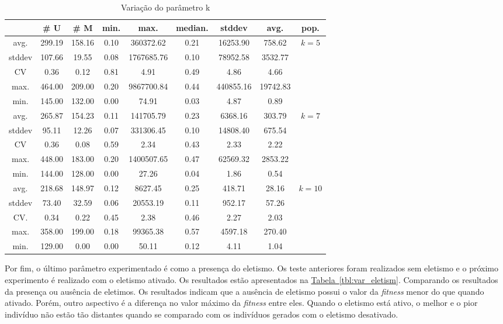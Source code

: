 \documentclass[a4paper]{paper}
\begin{document}
\begin{table}
  \center
  \caption{Variação do parâmetro k}
  \label{tbl:var_k}
  \begin{tabular}{| c | c | c | c | c | c | c | c | c |}
    \hline
    &  \# U & \# M & min. & max. & median. & stddev & avg. & pop. \\ \hline \hline
avg. & 299.19 & 158.16 & 0.10 & 360372.62 & 0.21 & 16253.90 & 758.62 & \multirow{5}{1.5cm}{$k=5$} \\ \cline{1-8}
stddev & 107.66 & 19.55 & 0.08 & 1767685.76 & 0.10 & 78952.58 & 3532.77 & \\ \cline{1-8}
CV & 0.36 & 0.12 & 0.81 & 4.91 & 0.49 & 4.86 & 4.66 & \\ \cline{1-8}
max. & 464.00 & 209.00 & 0.20 & 9867700.84 & 0.44 & 440855.16 & 19742.83 & \\ \cline{1-8}
min. & 145.00 & 132.00 & 0.00 & 74.91 & 0.03 & 4.87 & 0.89 & \\ \hline \hline
avg. & 265.87 & 154.23 & 0.11 & 141705.79 & 0.23 & 6368.16 & 303.79 & \multirow{5}{1.5cm}{$k=7$} \\ \cline{1-8}
stddev & 95.11 & 12.26 & 0.07 & 331306.45 & 0.10 & 14808.40 & 675.54 & \\ \cline{1-8}
CV & 0.36 & 0.08 & 0.59 & 2.34 & 0.43 & 2.33 & 2.22 & \\ \cline{1-8}
max. & 448.00 & 183.00 & 0.20 & 1400507.65 & 0.47 & 62569.32 & 2853.22 & \\ \cline{1-8}
min. & 144.00 & 128.00 & 0.00 & 27.26 & 0.04 & 1.86 & 0.54 & \\ \hline \hline
avg. & 218.68 & 148.97 & 0.12 & 8627.45 & 0.25 & 418.71 & 28.16 & \multirow{5}{1.5cm}{$k=10$}\\ \cline{1-8}
stddev & 73.40 & 32.59 & 0.06 & 20553.19 & 0.11 & 952.17 & 57.26 & \\ \cline{1-8}
CV. & 0.34 & 0.22 & 0.45 & 2.38 & 0.46 & 2.27 & 2.03 & \\ \cline{1-8}
max. & 358.00 & 199.00 & 0.18 & 99365.38 & 0.57 & 4597.18 & 270.40 & \\ \cline{1-8}
min. & 129.00 & 0.00 & 0.00 & 50.11 & 0.12 & 4.11 & 1.04 & \\ \hline \hline
  \end{tabular}
\end{table}

Por fim, o último parâmetro experimentado é como a presença do eletismo. Os
teste anteriores foram realizados sem eletismo e o próximo experimento é
realizado com o eletismo ativado. Os resultados estão apresentados na
\hyperref[tbl:var_eletism]{Tabela~\ref*{tbl:var_eletism}}. Comparando os resultados
da presença ou ausência de eletimos. Os resultados indicam que a ausência de
eletismo possui o valor da \textit{fitness} menor do que quando ativado. Porém,
outro aspectivo é a diferença no valor máximo da \textit{fitness} entre eles.
Quando o eletismo está ativo, o melhor e o pior indivíduo não estão tão distantes
quando se comparado com os indivíduos gerados com o eletismo desativado.
\end{document}
